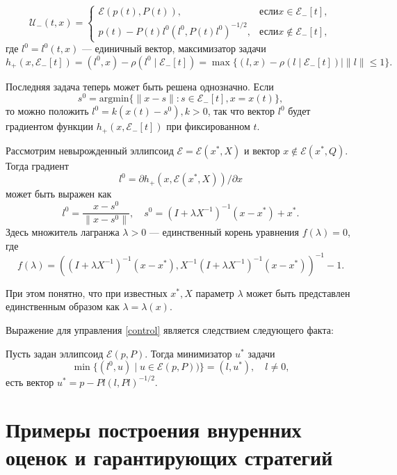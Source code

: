 \begin{equation}\label{control}
    \mathcal{U}_-(t,x) = 
     \begin{cases}
        \mathcal{E}(p(t), P(t)), & \text{если} x \in \mathcal{E}_-[t], \\
        p(t) - P(t)l^0(l^0, P(t)l^0)^{-1/2}, & \text{если} x \notin \mathcal{E}_-[t],
     \end{cases}
\end{equation}
где \( l^0 = l^0(t,x) \) --- единичный вектор, максимизатор задачи
\begin{equation}
    h_+(x, \mathcal{E}_-[t]) = (l^0,x) - \rho(l^0 \mid \mathcal{E}_-[t]) = \max\{(l,x) - \rho(l \mid 
     \mathcal{E}_-[t]) \mid \| l \| \le 1 \}.
\end{equation}

Последняя задача теперь может быть решена однозначно. Если 
\begin{equation}
    s^0 = \text{argmin}\{ \| x - s \| : s \in \mathcal{E}_-[t], x = x(t) \},
\end{equation}
то можно положить \( l^0 = k(x(t) - s^0), k > 0 \), так что вектор \( l^0 \) будет градиентом функции
\( h_+(x, \mathcal{E}_-[t]) \) при фиксированном \( t \). 

\begin{lemma}
    Рассмотрим невырожденный эллипсоид \( \mathcal{E} = \mathcal{E}(x^*, X) \) и вектор \( x \notin 
     \mathcal{E}(x^*, Q). \) Тогда градиент
    \begin{equation*}
        l^0 = \partial h_+(x, \mathcal{E}(x^*, X)) / \partial x
    \end{equation*}
    может быть выражен как 
    \begin{equation}
        l^0 = \frac{x - s^0}{\| x - s^0 \|}, \quad s^0 = (I + \lambda X^{-1})^{-1}(x - x^*) + x^*.
    \end{equation}
    Здесь множитель лагранжа \( \lambda > 0 \) --- единственный корень уравнения \( f(\lambda) = 0 \),
    где
    \begin{equation*}
        f(\lambda) = ((I + \lambda X^{-1})^{-1}(x - x^*), X^{-1}(I + \lambda X^{-1})^{-1}(x - x^*))^{-1} - 1.
    \end{equation*}
\end{lemma}

При этом понятно, что при известных \( x^*, X \) параметр \( \lambda \) может быть представлен 
 единственным образом как \( \lambda = \lambda(x) \).

Выражение для управления \eqref{control} является следствием следующего факта:
\begin{lemma}
    Пусть задан эллипсоид \( \mathcal{E}(p, P) \). Тогда минимизатор \( u^* \) задачи
    \begin{equation*}
        \min\{ (l^0, u) \mid u \in \mathcal{E}(p, P)) \} = (l, u^*), \quad l \ne 0, 
    \end{equation*}
    есть вектор \( u^* = p - Pl(l, Pl)^{-1/2} \).
\end{lemma}

\section{Примеры построения внуренних оценок и гарантирующих стратегий}
